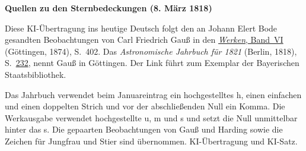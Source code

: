 \clearpage\thispagestyle{empty}
\begin{center}\textbf{Quellen zu den Sternbedeckungen (8. März 1818)}\end{center}
\noindent Diese KI-Übertragung ins heutige Deutsch folgt den an Johann Elert Bode gesandten Beobachtungen von Carl Friedrich Gauß in den \href{https://gdz.sub.uni-goettingen.de/id/PPN236007467}{\textit{Werken}, Band~VI} (Göttingen, 1874), S.~402. Das \textit{Astronomische Jahrbuch für 1821} (Berlin, 1818), S.~\href{https://api.digitale-sammlungen.de/iiif/image/v2/bsb10538350_00238/full/1600,/0/default.jpg}{232}, nennt Gauß in Göttingen. Der Link führt zum Exemplar der Bayerischen Staatsbibliothek.
\par\smallskip\noindent Das Jahrbuch verwendet beim Januareintrag ein hochgestelltes h, einen einfachen und einen doppelten Strich und vor der abschließenden Null ein Komma. Die Werkausgabe verwendet hochgestellte u, m und s und setzt die Null unmittelbar hinter das s. Die gepaarten Beobachtungen von Gauß und Harding sowie die Zeichen für Jungfrau und Stier sind übernommen. KI-Übertragung und KI-Satz.
\clearpage
